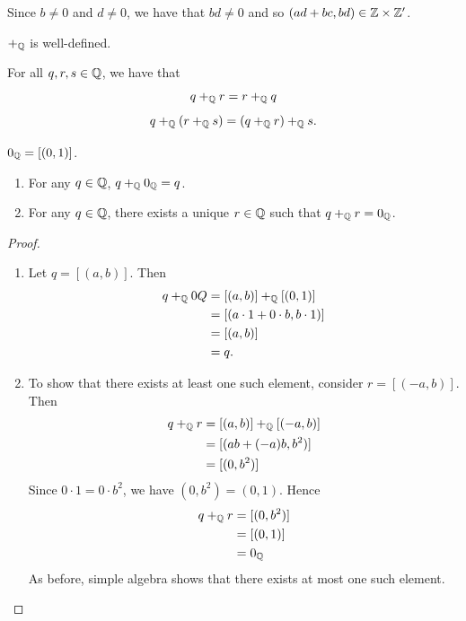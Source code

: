 \begin{remark}
Since $b\neq0$ and $d\neq0$, we have that $bd\neq0$ and so $(ad+bc,bd)\in\mathbb Z\times\mathbb Z^\prime$.
\end{remark}

\begin{lemma}
$+_\mathbb Q$ is well-defined.
\end{lemma}

\begin{theorem}
For all $q,r,s\in\mathbb Q$, we have that
\[q+_\mathbb Q r=r+_\mathbb Q q\]
\[q+_\mathbb Q(r+_\mathbb Q s)=(q+_\mathbb Q r)+_\mathbb Q s.\]
\end{theorem}

\begin{definition}
$0_\mathbb Q=[(0,1)]$.
\end{definition}

\begin{proposition}
\begin{enumerate}[label=(\arabic*)]
\item For any $q\in\mathbb Q$, $q+_\mathbb Q0_\mathbb Q=q$.
\item For any $q\in\mathbb Q$, there exists a unique $r\in\mathbb Q$ such that $q+_\mathbb Q r=0_\mathbb Q$.
\end{enumerate}
\end{proposition}

\begin{proof} \
\begin{enumerate}[label=(\arabic*)]
\item Let $q=[(a,b)]$. Then
\begin{align*}
q+_\mathbb Q0Q&=[(a,b)]+_\mathbb Q[(0,1)]\\
&=[(a\cdot1+0\cdot b,b\cdot1)]\\
&=[(a,b)]\\
&=q.
\end{align*}
\item To show that there exists at least one such element, consider $r=[(-a,b)]$. Then
\begin{align*}
q+_\mathbb Q r&=[(a,b)]+_\mathbb Q[(-a,b)]\\
&=[(ab+(-a)b,b^2)]\\
&=[(0,b^2)]
\end{align*}
Since $0\cdot1=0\cdot b^2$, we have $(0,b^2)=(0,1)$. Hence 
\begin{align*}
q+_\mathbb Q r&=[(0,b^2)]\\
&=[(0,1)]\\
&=0_\mathbb Q
\end{align*}
As before, simple algebra shows that there exists at most one such element.
\end{enumerate}
\end{proof}

